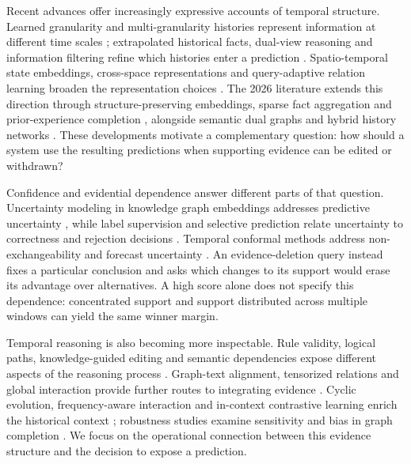 \documentclass[preprint,12pt]{elsarticle}
\begin{document}
Recent advances offer increasingly expressive accounts of temporal structure. Learned granularity and multi-granularity histories represent information at different time scales \citep{geng2025granularity,zhu2025multigran}; extrapolated historical facts, dual-view reasoning and information filtering refine which histories enter a prediction \citep{dao2025hgct,chen2025dualview,fernando2025filtering}. Spatio-temporal state embeddings, cross-space representations and query-adaptive relation learning broaden the representation choices \citep{ji2025stse,vu2025tcrosse,guo2025mamba}. The 2026 literature extends this direction through structure-preserving embeddings, sparse fact aggregation and prior-experience completion \citep{xu2026householder,zhu2026splices,peng2026icpe}, alongside semantic dual graphs and hybrid history networks \citep{zhang2026dstag,ye2026dualhistory}. These developments motivate a complementary question: how should a system use the resulting predictions when supporting evidence can be edited or withdrawn?

Confidence and evidential dependence answer different parts of that question. Uncertainty modeling in knowledge graph embeddings addresses predictive uncertainty \citep{liu2025uncertkg}, while label supervision and selective prediction relate uncertainty to correctness and rejection decisions \citep{li2025vicinal,szabadvary2025reject}. Temporal conformal methods address non-exchangeability and forecast uncertainty \citep{wang2025nonexchangeable,zhao2025stgraph}. An evidence-deletion query instead fixes a particular conclusion and asks which changes to its support would erase its advantage over alternatives. A high score alone does not specify this dependence: concentrated support and support distributed across multiple windows can yield the same winner margin.

Temporal reasoning is also becoming more inspectable. Rule validity, logical paths, knowledge-guided editing and semantic dependencies expose different aspects of the reasoning process \citep{pan2025validity,zhang2026logicalpaths,fan2026editing,yu2026dependency}. Graph-text alignment, tensorized relations and global interaction provide further routes to integrating evidence \citep{wan2026tgcallm,lee2026tirano,wang2026globalinteraction}. Cyclic evolution, frequency-aware interaction and in-context contrastive learning enrich the historical context \citep{bi2026globallocal,wang2026multidim,li2026calendar}; robustness studies examine sensitivity and bias in graph completion \citep{li2026entropyrobust,moon2026sharpness}. We focus on the operational connection between this evidence structure and the decision to expose a prediction.
\end{document}
